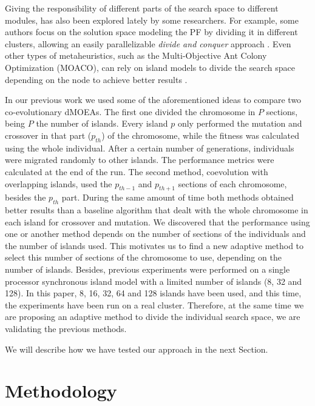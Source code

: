 \documentclass[preprint]{elsarticle}
\begin{document}
Giving the responsibility of different parts of the search space to
different modules, has also been explored lately by some
researchers. For example, some authors focus on the solution space
modeling the PF by dividing it in different clusters, allowing an
easily parallelizable {\em divide and conquer} approach
\citep{cheng2015adaptive}. Even other types of metaheuristics, such as
the Multi-Objective Ant Colony Optimization (MOACO), can rely on
island models to divide the search space depending on the node to
achieve better results \cite{Mora13Moacos}. 

In our previous work \citep{Garcia16hpmoon} we used some of
the aforementioned ideas to compare two co-evolutionary dMOEAs. The first
one divided the chromosome in $P$ sections, being $P$ the number of
islands. Every island $p$ only performed the mutation and crossover in
that part ($p_{th}$) of the chromosome, while the fitness was
calculated using the whole individual. After a certain number of
generations, individuals were migrated randomly to other islands. The
performance metrics were calculated at the end of the run. The second
method, coevolution with overlapping islands, used the $p_{th-1}$ and
$p_{th+1}$ sections of each chromosome, besides the $p_{th}$
part. During the same amount of time both methods obtained better
results than a baseline algorithm that dealt with the whole chromosome
in each island for crossover and mutation. We discovered that the
performance using one or another method depends on the number of
sections of the individuals and the number of islands used. This
motivates us to find a new adaptive method to select this number of
sections of the chromosome to use, depending on the number of
islands. Besides, previous experiments were performed on a single
processor synchronous island model with a limited number of islands
(8, 32 and 128). In this paper,  8, 16, 32, 64 and 128 islands have
been used, and this time, the experiments have been run on a real
cluster. Therefore, at the same time we are proposing an adaptive
method to divide the individual search space, we are validating the
previous methods. 


We will describe how we have tested our approach in the next Section.




%
%

\section{Methodology} %
\label{sec:coevo}
\end{document}

